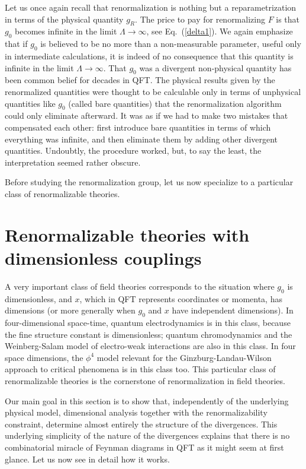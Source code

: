\documentclass[floatfix,twocolumn,preprintnumbers,amsmath,amssymb,prb]{revtex4}
\begin{document}
Let us once again recall that renormalization is nothing but a
reparametrization in terms of the physical quantity
$g_R$.\cite{foot7} The price to pay for renormalizing $F$ is that
$g_0$ becomes infinite in the limit
$\Lambda\to\infty$, see Eq.~(\ref{delta1}). We again emphasize
that if $g_0$ is believed to be no more than a non-measurable
parameter, useful only in intermediate calculations, it is indeed
of no consequence that this quantity is infinite in the limit
$\Lambda\to\infty$. That $g_0$ was a divergent non-physical
quantity has been common belief for decades in QFT. The physical
results given by the renormalized quantities were thought to be
calculable only in terms of unphysical quantities like $g_0$
(called bare quantities) that the renormalization algorithm 
could only eliminate afterward. It was as if we had to make two
mistakes that compensated each other: first introduce bare
quantities in terms of which everything was infinite, and then
eliminate them by adding other divergent quantities. Undoubtly,
the procedure worked, but, to say the least, the interpretation
seemed rather obscure.

Before studying the renormalization group, let us now specialize to
a particular class of renormalizable theories.

\section{Renormalizable theories with dimensionless couplings}
A very important class of field theories corresponds to the
situation where $g_0$ is dimensionless, and $x$, which in QFT
represents coordinates or momenta, has dimensions (or more
generally when $g_0$ and $x$ have independent dimensions). In
four-dimensional space-time, quantum
electrodynamics is in this class, because the fine structure
constant is dimensionless; quantum chromodynamics
and the Weinberg-Salam model of electro-weak interactions are
also in this class. In four space
dimensions, the $\phi^4$ model 
relevant for the Ginzburg-Landau-Wilson approach to critical
phenomena is in this class too. This particular class of renormalizable
theories is the cornerstone of renormalization in field theories.

Our main goal in this section is to show that, independently of
the underlying physical model, dimensional analysis together with
the renormalizability constraint, determine almost entirely the
structure of the divergences. This underlying simplicity of the
nature of the divergences explains that there is no
combinatorial miracle of Feynman diagrams in QFT as it might seem
at first glance. Let us now see in detail how it works.
\end{document}
